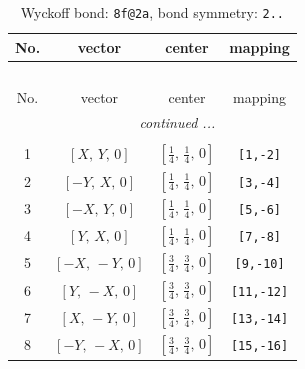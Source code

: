 \documentclass[fleqn,8pt]{jsarticle}
\begin{document}
\begin{longtable}{cccc}
\caption{Wyckoff bond: {\tt 8f@2a}, bond symmetry: {\tt 2..}}
 \\
 \hline \hline
No. & vector & center & mapping \\ \hline \endfirsthead

\multicolumn{3}{l}{\tablename\ \thetable{}} \\
 \hline \hline
No. & vector & center & mapping \\ \hline \endhead

 \hline \hline
\multicolumn{3}{r}{\footnotesize\it continued ...} \\ \endfoot

 \hline \hline
\multicolumn{3}{r}{} \\ \endlastfoot

1 & $\left[ X,\, Y,\, 0 \right]$ & $\left[ \frac{1}{4},\, \frac{1}{4},\, 0 \right]$ & {\tt [1,-2]} \\ \hline
2 & $\left[ - Y,\, X,\, 0 \right]$ & $\left[ \frac{1}{4},\, \frac{1}{4},\, 0 \right]$ & {\tt [3,-4]} \\ \hline
3 & $\left[ - X,\, Y,\, 0 \right]$ & $\left[ \frac{1}{4},\, \frac{1}{4},\, 0 \right]$ & {\tt [5,-6]} \\ \hline
4 & $\left[ Y,\, X,\, 0 \right]$ & $\left[ \frac{1}{4},\, \frac{1}{4},\, 0 \right]$ & {\tt [7,-8]} \\ \hline
5 & $\left[ - X,\, - Y,\, 0 \right]$ & $\left[ \frac{3}{4},\, \frac{3}{4},\, 0 \right]$ & {\tt [9,-10]} \\ \hline
6 & $\left[ Y,\, - X,\, 0 \right]$ & $\left[ \frac{3}{4},\, \frac{3}{4},\, 0 \right]$ & {\tt [11,-12]} \\ \hline
7 & $\left[ X,\, - Y,\, 0 \right]$ & $\left[ \frac{3}{4},\, \frac{3}{4},\, 0 \right]$ & {\tt [13,-14]} \\ \hline
8 & $\left[ - Y,\, - X,\, 0 \right]$ & $\left[ \frac{3}{4},\, \frac{3}{4},\, 0 \right]$ & {\tt [15,-16]} \\
\end{longtable}
\renewcommand{\arraystretch}{1.2}
\end{document}
